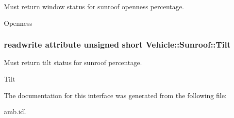 Must return window status for sunroof openness percentage. 

Openness \hypertarget{interfaceVehicle_1_1Sunroof_a7a6dbebaf54923cdc9a539113c2b4e3b}{
\subsubsection[{Tilt}]{\setlength{\rightskip}{0pt plus 5cm}readwrite attribute unsigned short Vehicle\-::\-Sunroof\-::\-Tilt}}\label{interfaceVehicle_1_1Sunroof_a7a6dbebaf54923cdc9a539113c2b4e3b}


Must return tilt status for sunroof percentage. 

Tilt 

The documentation for this interface was generated from the following file\-:\begin{DoxyCompactItemize}
\item 
amb.\-idl\end{DoxyCompactItemize}
